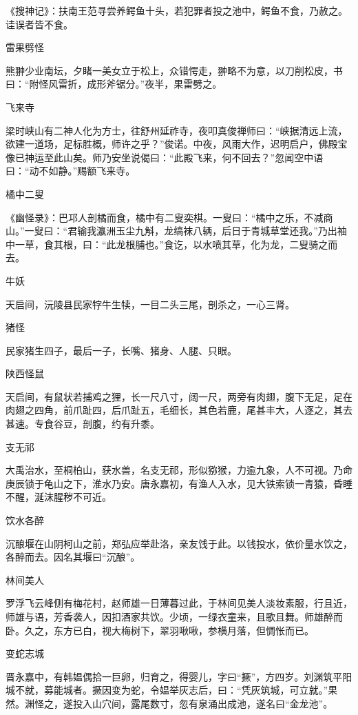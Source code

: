 \documentclass[a4paper,12pt,UTF8,twoside]{ctexbook}
\begin{document}
    《搜神记》：扶南王范寻尝养鳄鱼十头，若犯罪者投之池中，鳄鱼不食，乃赦之。诖误者皆不食。
    
    雷果劈怪
    
    熊翀少业南坛，夕睹一美女立于松上，众错愕走，翀略不为意，以刀削松皮，书曰：“附怪风雷折，成形斧锯分。”夜半，果雷劈之。
    
    飞来寺
    
    梁时峡山有二神人化为方士，往舒州延祚寺，夜叩真俊禅师曰：“峡据清远上流，欲建一道场，足标胜概，师许之乎？”俊诺。中夜，风雨大作，迟明启户，佛殿宝像已神运至此山矣。师乃安坐说偈曰：“此殿飞来，何不回去？”忽闻空中语曰：“动不如静。”赐额飞来寺。
    
    橘中二叟
    
    《幽怪录》：巴邛人剖橘而食，橘中有二叟奕棋。一叟曰：“橘中之乐，不减商山。”一叟曰：“君输我瀛洲玉尘九斛，龙缟袜八辆，后日于青城草堂还我。”乃出袖中一草，食其根，曰：“此龙根脯也。”食讫，以水喷其草，化为龙，二叟骑之而去。
    
    牛妖
    
    天启间，沅陵县民家牸牛生犊，一目二头三尾，剖杀之，一心三肾。
    
    猪怪
    
    民家猪生四子，最后一子，长嘴、猪身、人腿、只眼。
    
    陕西怪鼠
    
    天启间，有鼠状若捕鸡之狸，长一尺八寸，阔一尺，两旁有肉翅，腹下无足，足在肉翅之四角，前爪趾四，后爪趾五，毛细长，其色若鹿，尾甚丰大，人逐之，其去甚速。专食谷豆，剖腹，约有升黍。
    
    支无祁
    
    大禹治水，至桐柏山，获水兽，名支无祁，形似猕猴，力逾九象，人不可视。乃命庚辰锁于龟山之下，淮水乃安。唐永嘉初，有渔人入水，见大铁索锁一青猿，昏睡不醒，涎沫腥秽不可近。
    
    饮水各醉
    
    沉酿堰在山阴柯山之前，郑弘应举赴洛，亲友饯于此。以钱投水，依价量水饮之，各醉而去。因名其堰曰“沉酿”。
    
    林间美人
    
    罗浮飞云峰侧有梅花村，赵师雄一日薄暮过此，于林间见美人淡妆素服，行且近，师雄与语，芳香袭人，因扣酒家共饮。少顷，一绿衣童来，且歌且舞。师雄醉而卧。久之，东方已白，视大梅树下，翠羽啾啾，参横月落，但惆怅而已。
    
    变蛇志城
    
    晋永嘉中，有韩媪偶拾一巨卵，归育之，得婴儿，字曰“撅”，方四岁。刘渊筑平阳城不就，募能城者。撅因变为蛇，令媪举灰志后，曰：“凭灰筑城，可立就。”果然。渊怪之，遂投入山穴间，露尾数寸，忽有泉涌出成池，遂名曰“金龙池”。
    
\end{document}
